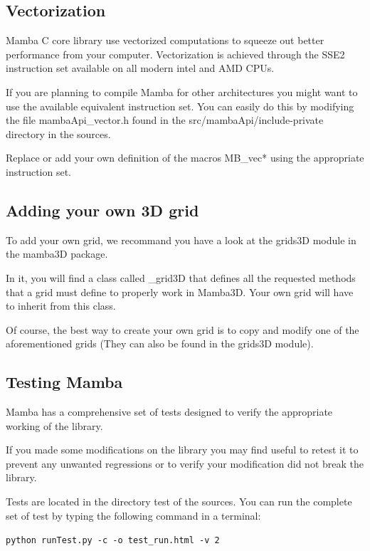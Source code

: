 \documentclass[a4paper,10pt,oneside]{article}
\begin{document}
\subsection{Vectorization}
\label{cha:vectorization}

Mamba C core library use vectorized computations to squeeze out better 
performance from your computer. Vectorization is achieved through the SSE2
instruction set available on all modern intel and AMD CPUs.

If you are planning to compile Mamba for other architectures you might want to
use the available equivalent instruction set. You can easily do this by modifying
the file mambaApi\_vector.h found in the src/mambaApi/include-private directory
in the sources.

Replace or add your own definition of the macros MB\_vec* using the appropriate
instruction set.

\subsection{Adding your own 3D grid}
\label{cha:create_grid3D}

To add your own grid, we recommand you have a look at the grids3D module in
the mamba3D package.

In it, you will find a class called \_grid3D that defines all the requested
methods that a grid must define to properly work in Mamba3D. Your own grid
will have to inherit from this class.

Of course, the best way to create your own grid is to copy and modify one
of the aforementioned grids (They can also be found in the grids3D module).

\subsection{Testing Mamba}
\label{cha:testing_mamba}

Mamba has a comprehensive set of tests designed to verify the appropriate
working of the library.

If you made some modifications on the library you may find useful to retest it
to prevent any unwanted regressions or to verify your modification did not break
the library.

Tests are located in the directory test of the sources. You can run the complete
set of test by typing the following command in a terminal:

\texttt{python runTest.py -c -o test\_run.html -v 2}
\end{document}
